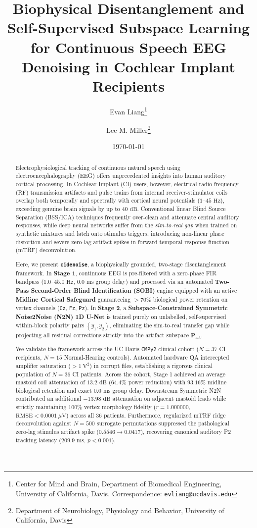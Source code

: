 \documentclass[11pt]{article}
\title{\textbf{Biophysical Disentanglement and Self-Supervised Subspace Learning for Continuous Speech EEG Denoising in Cochlear Implant Recipients}}
\author{
  Evan Liang\thanks{Center for Mind and Brain, Department of Biomedical Engineering, University of California, Davis. Correspondence: \texttt{evliang@ucdavis.edu}} \and
  Lee M. Miller\thanks{Department of Neurobiology, Physiology and Behavior, University of California, Davis}
}
\date{\today}
\begin{document}
\maketitle

\begin{abstract}
Electrophysiological tracking of continuous natural speech using electroencephalography (EEG) offers unprecedented insights into human auditory cortical processing. In Cochlear Implant (CI) users, however, electrical radio-frequency (RF) transmission artifacts and pulse trains from internal receiver-stimulator coils overlap both temporally and spectrally with cortical neural potentials ($1\text{--}45\text{ Hz}$), exceeding genuine brain signals by up to $40\text{ dB}$. Conventional linear Blind Source Separation (BSS/ICA) techniques frequently over-clean and attenuate central auditory responses, while deep neural networks suffer from the \textit{sim-to-real gap} when trained on synthetic mixtures and latch onto stimulus triggers, introducing non-linear phase distortion and severe zero-lag artifact spikes in forward temporal response function (mTRF) deconvolution.

Here, we present \textbf{\texttt{cidenoise}}, a biophysically grounded, two-stage disentanglement framework. In \textbf{Stage 1}, continuous EEG is pre-filtered with a zero-phase FIR bandpass ($1.0\text{--}45.0\text{ Hz}$, $0.0\text{ ms}$ group delay) and processed via an automated \textbf{Two-Pass Second-Order Blind Identification (SOBI)} engine equipped with an active \textbf{Midline Cortical Safeguard} guaranteeing $>70\%$ biological power retention on vertex channels (\texttt{Cz}, \texttt{Fz}, \texttt{Pz}). In \textbf{Stage 2}, a \textbf{Subspace-Constrained Symmetric Noise2Noise (N2N) 1D U-Net} is trained purely on unlabelled, self-supervised within-block polarity pairs $(y_1, y_2)$, eliminating the sim-to-real transfer gap while projecting all residual corrections strictly into the artifact subspace $\mathbf{P}_{\text{art}}$.

We validate the framework across the UC Davis \texttt{CMPy2} clinical cohort ($N = 37$ CI recipients, $N = 15$ Normal-Hearing controls). Automated hardware QA intercepted amplifier saturation ($> 1\ \text{V}^2$) in corrupt files, establishing a rigorous clinical population of $N = 36$ CI patients. Across the cohort, Stage 1 achieved an average mastoid coil attenuation of $13.2\text{ dB}$ ($64.4\%$ power reduction) with $93.16\%$ midline biological retention and exact $0.0\text{ ms}$ group delay. Downstream Symmetric N2N contributed an additional $-13.98\text{ dB}$ attenuation on adjacent mastoid leads while strictly maintaining $100\%$ vertex morphology fidelity ($r = 1.000000$, $\text{RMSE} < 0.0001\ \mu\text{V}$) across all 36 patients. Furthermore, regularized mTRF ridge deconvolution against $N = 500$ surrogate permutations suppressed the pathological zero-lag stimulus artifact spike ($0.5546 \to 0.0417$), recovering canonical auditory P2 tracking latency ($209.9\text{ ms}$, $p < 0.001$).
\end{abstract}
\end{document}
